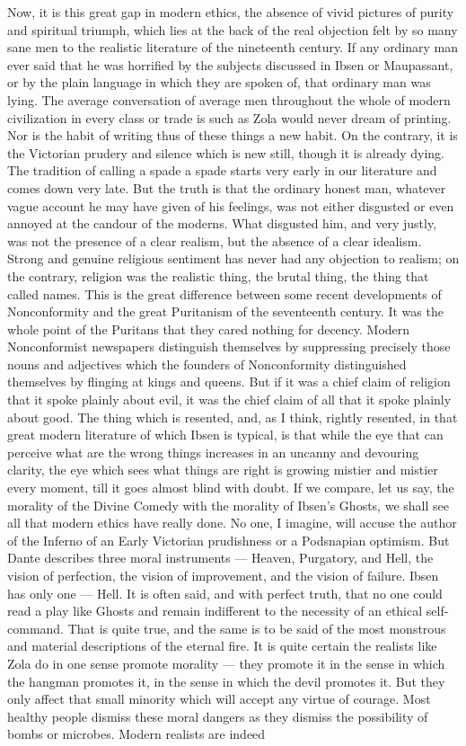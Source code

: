 Now, it is this great gap in modern ethics, the absence of vivid pictures of purity and spiritual triumph, which lies at the back of the real objection felt by so many sane men to the realistic literature of the nineteenth century. If any ordinary man ever said that he was horrified by the subjects discussed in Ibsen or Maupassant, or by the plain language in which they are spoken of, that ordinary man was lying. The average conversation of average men throughout the whole of modern civilization in every class or trade is such as Zola would never dream of printing. Nor is the habit of writing thus of these things a new habit. On the contrary, it is the Victorian prudery and silence which is new still, though it is already dying. The tradition of calling a spade a spade starts very early in our literature and comes down very late. But the truth is that the ordinary honest man, whatever vague account he may have given of his feelings, was not either disgusted or even annoyed at the candour of the moderns. What disgusted him, and very justly, was not the presence of a clear realism, but the absence of a clear idealism. Strong and genuine religious sentiment has never had any objection to realism; on the contrary, religion was the realistic thing, the brutal thing, the thing that called names. This is the great difference between some recent developments of Nonconformity and the great Puritanism of the seventeenth century. It was the whole point of the Puritans that they cared nothing for decency. Modern Nonconformist newspapers distinguish themselves by suppressing precisely those nouns and adjectives which the founders of Nonconformity distinguished themselves by flinging at kings and queens. But if it was a chief claim of religion that it spoke plainly about evil, it was the chief claim of all that it spoke plainly about good. The thing which is resented, and, as I think, rightly resented, in that great modern literature of which Ibsen is typical, is that while the eye that can perceive what are the wrong things increases in an uncanny and devouring clarity, the eye which sees what things are right is growing mistier and mistier every moment, till it goes almost blind with doubt. If we compare, let us say, the morality of the Divine Comedy with the morality of Ibsen’s Ghosts, we shall see all that modern ethics have really done. No one, I imagine, will accuse the author of the Inferno of an Early Victorian prudishness or a Podsnapian optimism. But Dante describes three moral instruments — Heaven, Purgatory, and Hell, the vision of perfection, the vision of improvement, and the vision of failure. Ibsen has only one — Hell. It is often said, and with perfect truth, that no one could read a play like Ghosts and remain indifferent to the necessity of an ethical self-command. That is quite true, and the same is to be said of the most monstrous and material descriptions of the eternal fire. It is quite certain the realists like Zola do in one sense promote morality — they promote it in the sense in which the hangman promotes it, in the sense in which the devil promotes it. But they only affect that small minority which will accept any virtue of courage. Most healthy people dismiss these moral dangers as they dismiss the possibility of bombs or microbes. Modern realists are indeed 